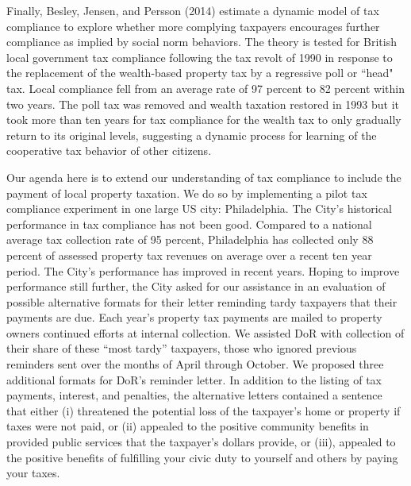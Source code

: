 \documentclass[12pt,titlepage]{article}
\begin{document}
Finally, Besley, Jensen, and Persson (2014) estimate a dynamic model
of tax compliance to explore whether more complying taxpayers
encourages further compliance as implied by social norm behaviors.
The theory is tested for British local government tax compliance
following the tax revolt of 1990 in response to the replacement of the
wealth-based property tax by a regressive poll or ``head" tax.  Local
compliance fell from an average rate of 97 percent to 82 percent
within two years.  The poll tax was removed and wealth taxation
restored in 1993 but it took more than ten years for tax compliance
for the wealth tax to only gradually return to its original levels,
suggesting a dynamic process for learning of the cooperative tax
behavior of other citizens.

Our agenda here is to extend our understanding of tax compliance to
include the payment of local property taxation.  We do so by 
implementing a pilot tax compliance experiment in one large US city:
Philadelphia.  The City’s historical performance in tax compliance
has not been good.  Compared to a national average tax collection
rate of 95 percent, Philadelphia has collected only 88 percent 
of assessed property tax revenues on average over a recent ten 
year period.  The City’s performance has improved in recent years.
Hoping to improve performance still further, the City asked for
our assistance in an evaluation of possible alternative formats
for their letter reminding tardy taxpayers that their payments
are due.   Each year’s property tax payments are mailed to 
property owners continued efforts at internal collection.  We
assisted DoR with collection of their share of these “most tardy”
taxpayers, those who ignored previous reminders sent over the months
of April through October.   We proposed three additional formats  for DoR's reminder
letter.  In addition to the listing of tax payments, interest, and
penalties, the alternative letters contained a sentence that either
(i) threatened the potential loss of the taxpayer's home or property
if taxes were not paid, or (ii) appealed to the positive community
benefits in provided public services that the taxpayer's dollars
provide, or (iii), appealed to the positive benefits of fulfilling
your civic duty to yourself and others by paying your taxes.
\end{document}
